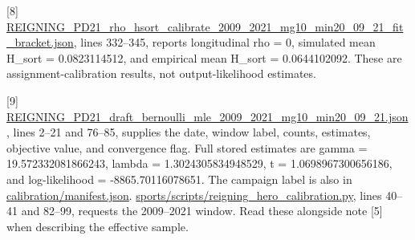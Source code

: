 {[}8{]} \href{file:////Users/charleslevine/Library/CloudStorage/Dropbox/1-Documents/00-\%20Dissertation/0-Next_Chapter/Code_and_Data/New\%20SQL\%20and\%20PY\%20Code/Cursor\%20Workspace\%20PDE/3-Master_Plan/re_entry/HEROs_and_PASSes/sports_sandbox/reigning_hero/calibration/rho/REIGNING_PD21_rho_hsort_calibrate_2009_2021_mg10_min20_09_21_fit_bracket.json}{REIGNING\_\allowbreak{}PD21\_\allowbreak{}rho\_\allowbreak{}hsort\_\allowbreak{}calibrate\_\allowbreak{}2009\_\allowbreak{}2021\_\allowbreak{}mg10\_\allowbreak{}min20\_\allowbreak{}09\_\allowbreak{}21\_\allowbreak{}fit\_\allowbreak{}bracket.json}, lines 332--345, reports longitudinal rho = 0, simulated mean H\_\allowbreak{}sort = 0.0823114512, and empirical mean H\_\allowbreak{}sort = 0.0644102092. These are assignment-calibration results, not output-likelihood estimates.

{[}9{]} \href{file:////Users/charleslevine/Library/CloudStorage/Dropbox/1-Documents/00-\%20Dissertation/0-Next_Chapter/Code_and_Data/New\%20SQL\%20and\%20PY\%20Code/Cursor\%20Workspace\%20PDE/3-Master_Plan/re_entry/HEROs_and_PASSes/sports_sandbox/reigning_hero/calibration/mle/REIGNING_PD21_draft_bernoulli_mle_2009_2021_mg10_min20_09_21.json}{REIGNING\_\allowbreak{}PD21\_\allowbreak{}draft\_\allowbreak{}bernoulli\_\allowbreak{}mle\_\allowbreak{}2009\_\allowbreak{}2021\_\allowbreak{}mg10\_\allowbreak{}min20\_\allowbreak{}09\_\allowbreak{}21.json}, lines 2--21 and 76--85, supplies the date, window label, counts, estimates, objective value, and convergence flag. Full stored estimates are gamma = 19.572332081866243, lambda = 1.3024305834948529, t = 1.0698967300656186, and log-likelihood = -8865.70116078651. The campaign label is also in \href{file:///Users/charleslevine/Library/CloudStorage/Dropbox/1-Documents/00-\%20Dissertation/0-Next_Chapter/Code_and_Data/New\%20SQL\%20and\%20PY\%20Code/Cursor\%20Workspace\%20PDE/3-Master_Plan/re_entry/HEROs_and_PASSes/sports_sandbox/reigning_hero/calibration/manifest.json}{calibration/manifest.json}. \href{file:///Users/charleslevine/Library/CloudStorage/Dropbox/1-Documents/00-\%20Dissertation/0-Next_Chapter/Code_and_Data/New\%20SQL\%20and\%20PY\%20Code/Cursor\%20Workspace\%20PDE/sports/scripts/reigning_hero_calibration.py}{sports/scripts/reigning\_\allowbreak{}hero\_\allowbreak{}calibration.py}, lines 40--41 and 82--99, requests the 2009--2021 window. Read these alongside note {[}5{]} when describing the effective sample.

